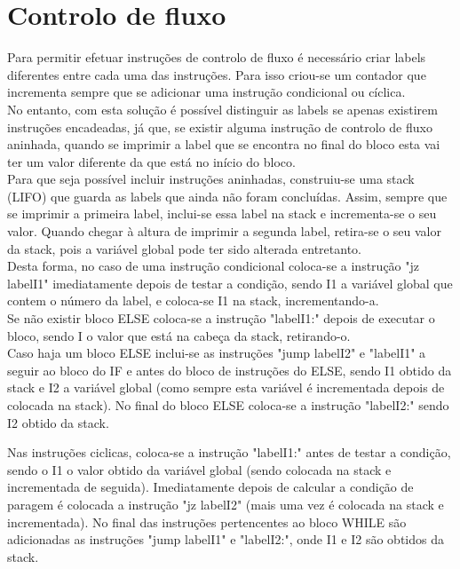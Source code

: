 \documentclass{report}
\begin{document}
\section{Controlo de fluxo}
Para permitir efetuar instruções de controlo de fluxo é necessário criar labels diferentes entre cada uma das instruções. Para isso criou-se um contador que incrementa sempre que se adicionar uma instrução condicional ou cíclica.\\
No entanto, com esta solução é possível distinguir as labels se apenas existirem instruções encadeadas, já que, se existir alguma instrução de controlo de fluxo aninhada, quando se imprimir a label que se encontra no final do bloco esta vai ter um valor diferente da que está no início do bloco.\\
Para que seja possível incluir instruções aninhadas, construiu-se uma stack (LIFO) que guarda as labels que ainda não foram concluídas. Assim, sempre que se imprimir a primeira label, inclui-se essa label na stack e incrementa-se o seu valor. Quando chegar à altura de imprimir a segunda label, retira-se o seu valor da stack, pois a variável global pode ter sido alterada entretanto.\\
Desta forma, no caso de uma instrução condicional coloca-se a instrução "jz labelI1" imediatamente depois de testar a condição, sendo I1 a variável global que contem o número da label, e coloca-se I1 na stack, incrementando-a.\\
Se não existir bloco ELSE coloca-se a instrução "labelI1:" depois de executar o bloco, sendo I o valor que está na cabeça da stack, retirando-o.\\
Caso haja um bloco ELSE inclui-se as instruções "jump labelI2" e "labelI1" a seguir ao bloco do IF e antes do bloco de instruções do ELSE, sendo I1 obtido da stack e I2 a variável global (como sempre esta variável é incrementada depois de colocada na stack). No final do bloco ELSE coloca-se a instrução "labelI2:" sendo I2 obtido da stack.
\item Nas instruções ciclicas, coloca-se a instrução "labelI1:" antes de testar a condição, sendo o I1 o valor obtido da variável global (sendo colocada na stack e incrementada de seguida). Imediatamente depois de calcular a condição de paragem é colocada a instrução "jz labelI2" (mais uma vez é colocada na stack e incrementada). No final das instruções pertencentes ao bloco WHILE são adicionadas as instruções "jump labelI1" e "labelI2:", onde I1 e I2 são obtidos da stack.
\end{document}
